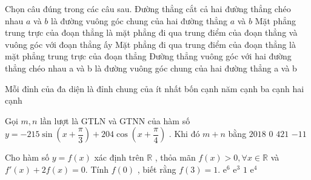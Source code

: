 \begin{ex}%
Chọn câu đúng trong các câu sau.
\choice
{ Đường thẳng cắt cả hai đường thẳng chéo nhau $a$ và $b$ là đường vuông góc chung của hai đường thẳng $a$ và $b$}
{\True Mặt phẳng trung trực của đoạn thẳng là mặt phẳng đi qua trung điểm của đoạn thẳng và vuông góc với đoạn thẳng ấy}
{ Mặt phẳng đi qua trung điểm của đoạn thẳng là mặt phẳng trung trực của đoạn thẳng}
{ Đường thẳng vuông góc với hai đường thẳng chéo nhau a và b là đường vuông góc chung của hai đường thẳng a và b}
\end{ex}
\begin{ex}%
Mỗi đỉnh của đa diện là đỉnh chung của ít nhất
\choice
{ bốn cạnh}
{ năm cạnh}
{\True ba cạnh}
{ hai cạnh}
\end{ex}
\begin{ex}%
Gọi $m,n$ lần lượt là GTLN và GTNN của hàm số $y=-215\sin\left ( x+\dfrac{\pi }{3} \right)+204\cos \left( x+\dfrac{\pi }{4} \right)$ . Khi đó $m+n$ bằng
\choice
{ $2018$}
{\True $0$}
{ $421$}
{ $-11$}
\end{ex}
\begin{ex}%
Cho hàm số $y=f(x)$ xác định trên $\mathbb{R}$ , thỏa mãn $f(x)>0, \forall x\in\mathbb{R}$ và  $f'(x)+2f(x)=0$. Tính  $f(0)$ , biết rằng $f(3)=1$.
\choice
{\True $\mathrm{e}^6$ }
{$\mathrm{e}^3$ }
{ $1$}
{$\mathrm{e}^4$ }
\end{ex}
